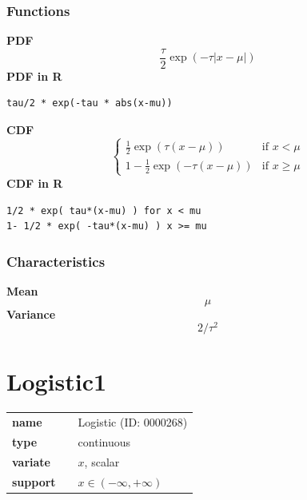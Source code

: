 \subsubsection*{Functions}

\smallskip \noindent \hspace{.2cm} \textbf{PDF} 
\begin{equation*}\frac{\tau}{2} \exp \left(-\tau|x-\mu| \right)\end{equation*}
\smallskip \noindent \hspace{.2cm} \textbf{PDF in R}  
\begin{verbatim}tau/2 * exp(-tau * abs(x-mu))\end{verbatim}
\smallskip \noindent \hspace{.2cm} \textbf{CDF} 
\begin{equation*}\begin{cases}
\frac12 \exp \left( \tau (x-\mu) \right) & \mbox{if }x < \mu \\
1-\frac12 \exp \left( -\tau (x-\mu) \right) & \mbox{if }x \geq \mu
\end{cases}\end{equation*}
\smallskip \noindent \hspace{.2cm} \textbf{CDF in R} 
\begin{verbatim}1/2 * exp( tau*(x-mu) ) for x < mu
1- 1/2 * exp( -tau*(x-mu) ) x >= mu\end{verbatim}
\smallskip
\subsubsection*{Characteristics}
\smallskip \noindent \hspace{.2cm} \textbf{Mean} 
\begin{equation*}\mu\end{equation*}
\smallskip \noindent \hspace{.2cm} \textbf{Variance} 
\begin{equation*}2 / \tau^2\end{equation*}
\smallskip
\section*{Logistic1} 

  \bigskip 

\begin{tabular}{p{2cm}cl}
\textbf{name} & & Logistic (ID: 0000268)\\ 
 
\textbf{type} & & continuous \\ 

\textbf{variate} & & $x$, scalar \\ 

\textbf{support} & & $x \in (-\infty,+\infty)$
\end{tabular}

